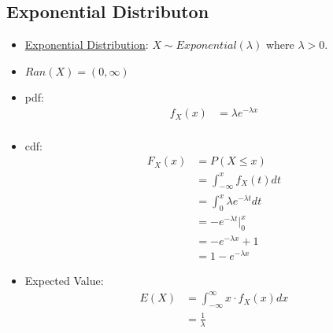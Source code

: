 \documentclass[12pt]{article}
\begin{document}
        \subsection{Exponential Distributon}
            \begin{itemize}
                \item \underline{Exponential Distribution}: $X \sim Exponential(\lambda)$ where $\lambda > 0$.
                \item $Ran(X) = (0, \infty)$
                \item pdf:
                \begin{align*}
                    f_X(x) &= \lambda e^{-\lambda x} \\
                \end{align*}
                \item cdf:
                \begin{align*}
                    F_X(x) &= P(X \leq x) \\
                    &= \int_{-\infty}^{x} f_X(t) dt \\
                    &= \int_{0}^{x} \lambda e^{-\lambda t} dt \\
                    &= -e^{-\lambda t} \Big|_{0}^{x} \\
                    &= -e^{-\lambda x} + 1 \\
                    &= 1 - e^{-\lambda x}
                \end{align*}
                \item Expected Value:
                \begin{align*}
                    E(X) &= \int_{-\infty}^{\infty} x \cdot f_X(x) dx \\
                    &= \frac{1}{\lambda}
                \end{align*}
            \end{itemize}
\end{document}
